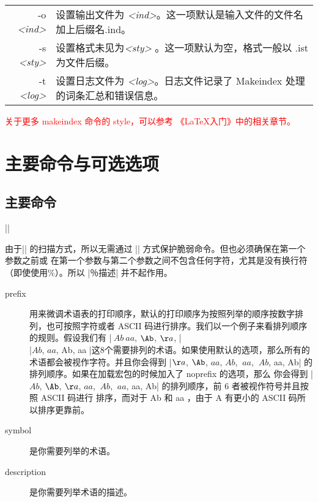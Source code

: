 \documentclass{ctexart}
\newcommand{\txr}[1]{\textcolor{red}{#1}}
\begin{document}
\bigskip
\begin{tabular}{rl}
    -o \textit{<ind>}     &     设置输出文件为 \textit{<ind>}。这一项默认是输入文件的文件名加上后缀名.ind。\\
    -s \textit{<sty>}     &		 设置格式未见为\textit{<sty>} 。这一项默认为空，格式一般以 .ist 为文件后缀。   \\
    -t \textit{<log>}    &		设置日志文件为 \textit{<log>}。日志文件记录了 Makeindex 处理的词条汇总和错误信息。
 \end{tabular}

\noindent \txr{关于更多 makeindex 命令的 style，可以参考 《\LaTeX 入门》中的相关章节。}

\section{主要命令与可选选项}

\subsection{主要命令}
\noindent ||
\par 由于|\nomenclature| 的扫描方式，所以无需通过 |\protect| 方式保护脆弱命令。但也必须确保在第一个参数之前或
在第一个参数与第二个参数之间不包含任何字符，尤其是没有换行符（即使使用$\%$）。所以
|％{描述}| 并不起作用。
\begin{description}
\item [prefix] 用来微调术语表的打印顺序，默认的打印顺序为按照列举的顺序按数字排列，也可按照字符或者 ASCII 
码进行排序。我们以一个例子来看排列顺序的规则。假设我们有 |$~Ab$$~aa$, $\Ab$, $\aa$, |\\ 
|$Ab$, $aa$, Ab, aa |这8个需要排列的术语。如果使用默认的选项，那么所有的术语都会被视作字符。并且你会得到
|$\aa$, $\Ab$, $aa$, $Ab$, $~aa$, $~Ab$, aa, Ab| 的排列顺序。如果在加载宏包的时候加入了 noprefix 的选项，那么
你会得到 |$Ab$, $\Ab$, $\aa$, $aa$, $~Ab$, $~aa$, aa, Ab| 的排列顺序，前 6 者被视作符号并且按照 ASCII 码进行
排序，而对于 Ab 和 aa ，由于 A 有更小的 ASCII 码所以排序更靠前。
\item [symbol]  是你需要列举的术语。
\item [description] 是你需要列举术语的描述。
\end{description}
\end{document}

